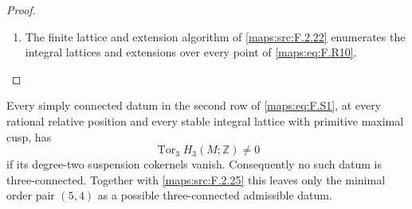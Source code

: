 \begin{proof}
\begin{enumerate}[label={$\langle1\rangle$\arabic*.}]
\item The finite lattice and extension algorithm of \ref{maps:src:F.2.22}
enumerates the integral lattices and extensions over every point of
\eqref{maps:eq:F.R10}.

\end{enumerate}
\end{proof}




\begin{theorem}\hypertarget{tag-02NH}{}\label{maps:src:F.2.27}


Every simply connected datum in the second row of \eqref{maps:eq:F.S1},
at every rational relative position and every stable integral
lattice with primitive maximal cusp, has
\[
                 \operatorname{Tor}_3 H_3(M;\mathbb Z)\ne0
\]
if its degree-two suspension cokernels vanish.
Consequently no such datum is three-connected.  Together with
\ref{maps:src:F.2.25} this leaves only the minimal order pair $(5,4)$ as a possible three-connected admissible datum.
\end{theorem}


